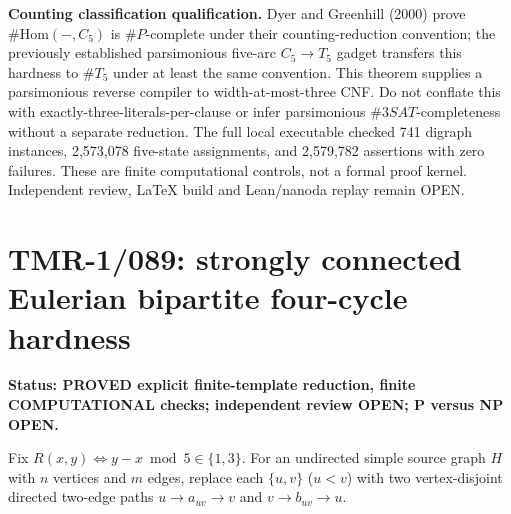 \documentclass[11pt]{article}
\begin{document}
\noindent\textbf{Counting classification qualification.}
Dyer and Greenhill (2000) prove $\#\mathrm{Hom}(-,C_5)$
is $\#P$-complete under their counting-reduction convention;
the previously established parsimonious five-arc
$C_5\to T_5$ gadget transfers this hardness to $\#T_5$
under at least the same convention. This theorem supplies
a parsimonious reverse compiler to width-at-most-three CNF.
Do not conflate this with exactly-three-literals-per-clause
or infer parsimonious $\#3SAT$-completeness without a
separate reduction. The full local executable checked
741 digraph instances, 2,573,078 five-state assignments,
and 2,579,782 assertions with zero failures. These are
finite computational controls, not a formal proof kernel.
Independent review, LaTeX build and Lean/nanoda replay
remain OPEN.


\section{TMR-1/089: strongly connected Eulerian bipartite four-cycle hardness}
\noindent\textbf{Status: PROVED explicit finite-template reduction,
finite COMPUTATIONAL checks; independent review OPEN; P versus NP OPEN.}

Fix $R(x,y)\iff y-x\bmod5\in\{1,3\}$. For an undirected simple
source graph $H$ with $n$ vertices and $m$ edges, replace each
$\{u,v\}$ ($u<v$) with two vertex-disjoint directed two-edge paths
$u\to a_{uv}\to v$ and $v\to b_{uv}\to u$.
\end{document}
